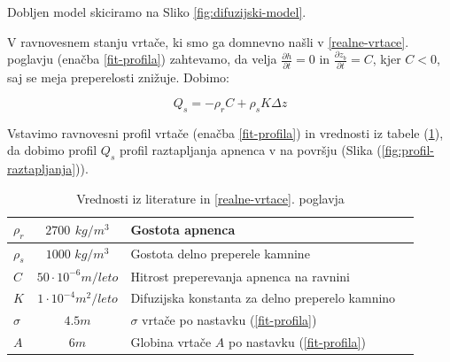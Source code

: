 \documentclass[a4paper, oneside, 12pt]{book}
\begin{document}
      Dobljen model skiciramo na Sliko \ref{fig:difuzijski-model}.

      V ravnovesnem stanju vrtače, ki smo ga domnevno našli v \ref{realne-vrtace}. poglavju (enačba \ref{fit-profila}) zahtevamo, da velja $\frac{\partial h}{\partial t} = 0$ in $\frac{\partial z_b}{\partial t} = C$, kjer $C<0$, saj se meja preperelosti znižuje. Dobimo:

      \begin{equation}
        Q_s = - \rho_r C + \rho_s K \Delta z
        \label{kontinuitetna-enacba-ravnovesje}
      \end{equation}

      Vstavimo ravnovesni profil vrtače (enačba \ref{fit-profila}) in vrednosti iz tabele (\ref{tab:tabela-konstant}), da dobimo profil $Q_s$ profil raztapljanja apnenca v na površju (Slika (\ref{fig:profil-raztapljanja})).

      \begin{table}[h]
        \centering
        \begin{tabular}{| l | c | l | l |} \hline
          $\rho_r$ & $2700$ $kg/m^3$ & Gostota apnenca                                            \\ \hline
          $\rho_s$ & $1000$ $kg/m^3$ & Gostota delno preperele kamnine                            \\ \hline
          $C$      & $50 \cdot 10^{-6} m/leto$  & Hitrost preperevanja apnenca na ravnini         \\ \hline
          $K$      & $1 \cdot 10^{-4} m^2/leto$ & Difuzijska konstanta za delno preperelo kamnino \\ \hline
          $\sigma$ & $4.5m$ & $\sigma$ vrtače po nastavku (\ref{fit-profila})                     \\ \hline
          $A$      & $6m$ & Globina vrtače $A$ po nastavku (\ref{fit-profila})                    \\ \hline
        \end{tabular}
        \caption{Vrednosti iz literature \cite{Gams1967} \cite{ford2007karst} \cite{fleurant2008modelling} in \ref{realne-vrtace}. poglavja}
        \label{tab:tabela-konstant}
      \end{table}
\end{document}
